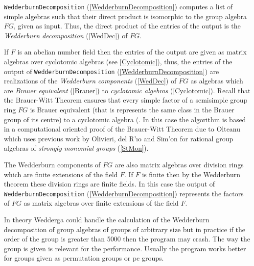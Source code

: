 \documentclass[a4paper,11pt]{report}
\begin{document}
{{ \texttt{WedderburnDecomposition} (\ref{WedderburnDecomposition}) computes a list of simple algebras such that their direct product is
isomorphic to the group algebra $FG$, given as input. Thus, the direct product of the entries of the output is the \emph{Wedderburn decomposition} (\ref{WedDec}) of $FG$. 

 If $F$ is an abelian number field then the entries of the output are given as matrix
algebras over cyclotomic algebras (see \ref{Cyclotomic}), thus, the entries of the output of \texttt{WedderburnDecomposition} (\ref{WedderburnDecomposition}) are realizations of the \emph{Wedderburn components} (\ref{WedDec}) of $FG$ as algebras which are \emph{Brauer equivalent} (\ref{Brauer}) to \emph{cyclotomic algebras} (\ref{Cyclotomic}). Recall that the Brauer-Witt Theorem ensures that every simple factor of a
semisimple group ring $FG$ is Brauer equivalent (that is represents the same class in the Brauer group of
its centre) to a cyclotomic algebra (\cite{Y}. In this case the algorithm is based in a computational oriented proof of the
Brauer-Witt Theorem due to Olteanu \cite{O} which uses previous work by Olivieri, del R{\a'\i}o and Sim{\a'o}n \cite{ORS} for rational group algebras of \emph{strongly monomial groups} (\ref{StMon}). 

 The Wedderburn components of $FG$ are also matrix algebras over division rings which are finite extensions of
the field $F$. If $F$ is finite then by the Wedderburn theorem these division rings are finite
fields. In this case the output of \texttt{WedderburnDecomposition} (\ref{WedderburnDecomposition}) represents the factors of $FG$ as matrix algebras over finite extensions of the field $F$. 

 In theory \textsf{Wedderga} could handle the calculation of the Wedderburn decomposition of group algebras
of groups of arbitrary size but in practice if the order of the group is
greater than 5000 then the program may crash. The way the group is given is
relevant for the performance. Usually the program works better for groups
given as permutation groups or pc groups. 
\begin{Verbatim}[commandchars=!@|,fontsize=\small,frame=single,label=Example]
  

\end{Verbatim}}}
\end{document}

